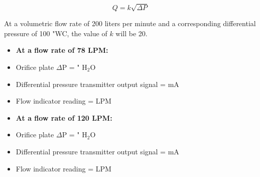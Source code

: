 
$$Q = k \sqrt{\Delta P}$$

At a volumetric flow rate of 200 liters per minute and a corresponding differential pressure of 100 "WC, the value of $k$ will be 20.

\begin{itemize}
\item {} {\bf At a flow rate of 78 LPM:}
\vskip 5pt
\item{} Orifice plate $\Delta$P =  " H$_{2}$O
\vskip 5pt
\item{} Differential pressure transmitter output signal =  mA
\vskip 5pt
\item{} Flow indicator reading =  LPM
\end{itemize}

\vskip 10pt

\begin{itemize}
\item {} {\bf At a flow rate of 120 LPM:}
\vskip 5pt
\item{} Orifice plate $\Delta$P =  " H$_{2}$O
\vskip 5pt
\item{} Differential pressure transmitter output signal =  mA
\vskip 5pt
\item{} Flow indicator reading =  LPM
\end{itemize}













